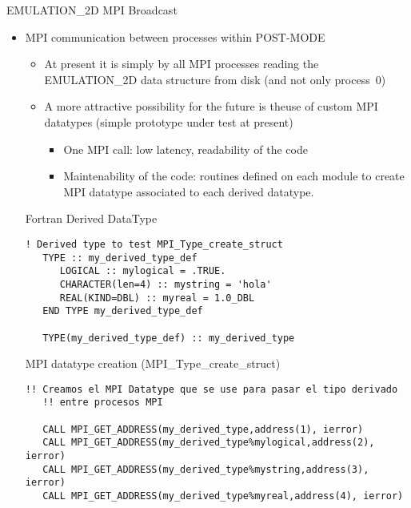\begin{frame}{EMULATION\_2D MPI Broadcast}
\begin{itemize}
\framebreak %

\item MPI communication between processes within POST-MODE
  \begin{itemize}
  \item \alert{At present} it is simply by all MPI processes reading the
    EMULATION\_2D data structure from disk (and not only process~0)

  \item A more attractive possibility \alert{for the future} is
    the\alert{use of custom MPI datatypes} (simple prototype under
    test at present)
    \begin{itemize}
    \item One MPI call: low latency, readability of the code
    \item Maintenability of the code: routines defined on each module
      to create MPI datatype associated to each derived datatype.
    \end{itemize}
  \end{itemize}

  
   \framebreak %

   \begin{block}{Fortran Derived DataType}
     \begin{lstlisting}[style=myFORTRANcodeS,basicstyle=\ttfamily\footnotesize]
   ! Derived type to test MPI_Type_create_struct
   TYPE :: my_derived_type_def
      LOGICAL :: mylogical = .TRUE.
      CHARACTER(len=4) :: mystring = 'hola'
      REAL(KIND=DBL) :: myreal = 1.0_DBL
   END TYPE my_derived_type_def

   TYPE(my_derived_type_def) :: my_derived_type   
     \end{lstlisting}
   \end{block}
   
   \framebreak %
   
\begin{block}{MPI datatype creation (MPI\_Type\_create\_struct) \insertcontinuationtext}   
\begin{lstlisting}[style=myFORTRANcodeS,basicstyle=\ttfamily\footnotesize]
   !! Creamos el MPI Datatype que se use para pasar el tipo derivado
   !! entre procesos MPI

   CALL MPI_GET_ADDRESS(my_derived_type,address(1), ierror)
   CALL MPI_GET_ADDRESS(my_derived_type%mylogical,address(2), ierror)
   CALL MPI_GET_ADDRESS(my_derived_type%mystring,address(3), ierror)
   CALL MPI_GET_ADDRESS(my_derived_type%myreal,address(4), ierror)


\end{lstlisting}
\end{block}
\end{itemize}
\end{frame}
